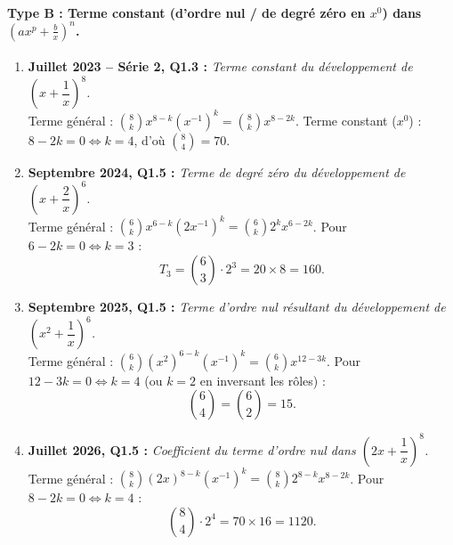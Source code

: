 \begin{exemple}
\paragraph{Type B : Terme constant (d'ordre nul / de degré zéro en $x^0$) dans $\left(ax^p + \frac{b}{x}\right)^n$.}
\begin{enumerate}[resume]
    \item \textbf{Juillet 2023 -- Série 2, Q1.3 :} \emph{Terme constant du développement de $\left(x + \dfrac{1}{x}\right)^8$.}\\
    Terme général : $\binom{8}{k} x^{8-k} (x^{-1})^k = \binom{8}{k} x^{8-2k}$. Terme constant ($x^0$) : $8 - 2k = 0 \iff k = 4$, d'où $\binom{8}{4} = \boxed{70}$.
    \item \textbf{Septembre 2024, Q1.5 :} \emph{Terme de degré zéro du développement de $\left(x + \dfrac{2}{x}\right)^6$.}\\
    Terme général : $\binom{6}{k} x^{6-k} (2x^{-1})^k = \binom{6}{k} 2^k x^{6-2k}$. Pour $6 - 2k = 0 \iff k = 3$ :
    \[
        T_3 = \binom{6}{3} \cdot 2^3 = 20 \times 8 = \boxed{160}.
    \]
    \item \textbf{Septembre 2025, Q1.5 :} \emph{Terme d'ordre nul résultant du développement de $\left(x^2 + \dfrac{1}{x}\right)^6$.}\\
    Terme général : $\binom{6}{k} (x^2)^{6-k} (x^{-1})^k = \binom{6}{k} x^{12-3k}$. Pour $12 - 3k = 0 \iff k = 4$ (ou $k = 2$ en inversant les rôles) :
    \[
        \binom{6}{4} = \binom{6}{2} = \boxed{15}.
    \]
    \item \textbf{Juillet 2026, Q1.5 :} \emph{Coefficient du terme d'ordre nul dans $\left(2x + \dfrac{1}{x}\right)^8$.}\\
    Terme général : $\binom{8}{k} (2x)^{8-k} (x^{-1})^k = \binom{8}{k} 2^{8-k} x^{8-2k}$. Pour $8 - 2k = 0 \iff k = 4$ :
    \[
        \binom{8}{4} \cdot 2^4 = 70 \times 16 = \boxed{1120}.
    \]
\end{enumerate}


\end{exemple}

